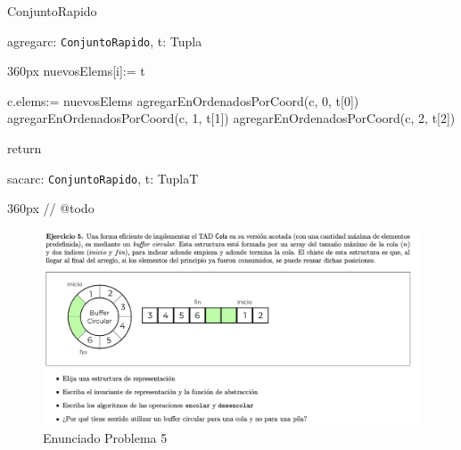 \documentclass[10pt,a4paper]{article}
\begin{document}
\begin{ModuloImplements}{ConjuntoRapido}{{}}
\begin{proc}{agregar}{\Inout c: \texttt{ConjuntoRapido}, \In t: Tupla}{}
\begin{ImplementationCode}{360px}
      nuevosElems[i]:= t

      c.elems:= nuevosElems
      agregarEnOrdenadosPorCoord(c, 0, t[0])
      agregarEnOrdenadosPorCoord(c, 1, t[1])
      agregarEnOrdenadosPorCoord(c, 2, t[2])

      return
    \end{ImplementationCode}
  \end{proc}
  \begin{proc}{sacar}{\Inout c: \texttt{ConjuntoRapido}, \In t: Tupla}{T}
    \begin{ImplementationCode}{360px}
      // @todo
    \end{ImplementationCode}
  \end{proc}
\end{ModuloImplements}

\newpage
{}

\begin{figure}[h]
  \centering
  \includegraphics[width=\textwidth]{images/nuevo_ejercicio_5.png}
  \caption{Enunciado Problema 5}
  \label{fig:ej_5}
\end{figure}
\end{document}
